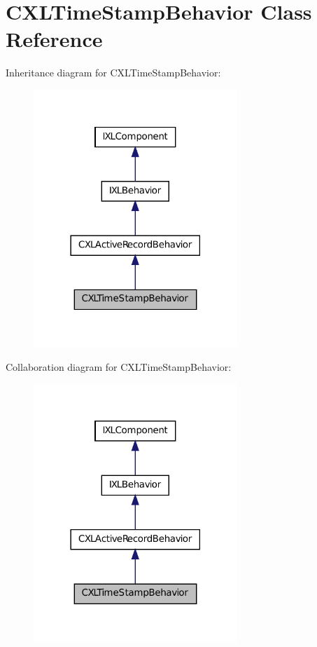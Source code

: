 \hypertarget{classCXLTimeStampBehavior}{
\section{CXLTimeStampBehavior Class Reference}
\label{classCXLTimeStampBehavior}
}


Inheritance diagram for CXLTimeStampBehavior:\nopagebreak
\begin{figure}[H]
\begin{center}
\leavevmode
\includegraphics[width=218pt]{classCXLTimeStampBehavior__inherit__graph}
\end{center}
\end{figure}


Collaboration diagram for CXLTimeStampBehavior:\nopagebreak
\begin{figure}[H]
\begin{center}
\leavevmode
\includegraphics[width=218pt]{classCXLTimeStampBehavior__coll__graph}
\end{center}
\end{figure}
